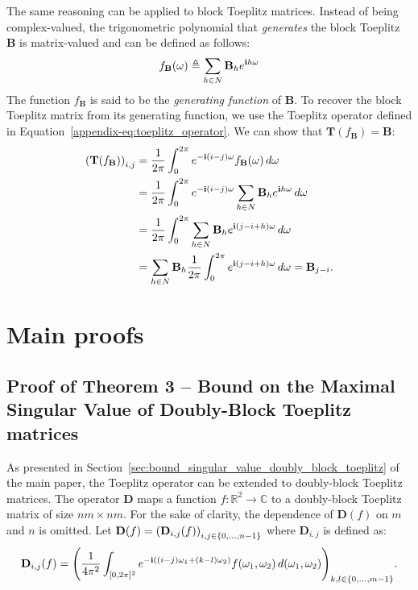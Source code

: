 The same reasoning can be applied to block Toeplitz matrices. Instead of being complex-valued, the trigonometric polynomial that {\em generates} the block Toeplitz $\mathbf{B}$ is matrix-valued and can be defined as follows:
\begin{equation}
    f_{\mathbf{B}}(\omega) \triangleq \sum_{h \in N} \mathbf{B}_h e^{\mathbf{i} h \omega}
\end{equation}
The function $f_{\mathbf{B}}$ is said to be the \emph{generating function} of $\mathbf{B}$. To recover the block Toeplitz matrix from its generating function, we use the Toeplitz operator defined in Equation~\ref{appendix-eq:toeplitz_operator}. We can show that $\mathbf{T}(f_\mathbf{B}) = \mathbf{B}$:
\begin{align}
    \leftmat \mathbf{T}(f_\mathbf{B}) \rightmat_{i, j} &= \frac{1}{2\pi} \int_0^{2\pi} e^{-\ci (i-j)\omega} f_{\mathbf{B}}(\omega) \,d\omega  \\
    &= \frac{1}{2\pi} \int_0^{2\pi} e^{-\ci (i-j) \omega} \sum_{h \in N} \mathbf{B}_h e^{\ci h \omega} \,d\omega  \\
    &= \frac{1}{2\pi} \int_0^{2\pi} \sum_{h \in N} \mathbf{B}_h e^{\ci (j - i + h) \omega} \,d\omega  \\
    &= \sum_{h \in N} \mathbf{B}_h \frac{1}{2\pi} \int_0^{2\pi} e^{\ci (j - i + h) \omega} \,d\omega 
    = \mathbf{B}_{j-i} .
\end{align}





\section{Main proofs}

\subsection{Proof of Theorem 3 -- Bound on the Maximal Singular Value of Doubly-Block Toeplitz matrices}

As presented in Section~\ref{sec:bound_singular_value_doubly_block_toeplitz} of the main paper, the Toeplitz operator can be extended to doubly-block Toeplitz matrices. 
The operator $\mathbf{D}$ maps a function $f: \mathbb{R}^2 \rightarrow \mathbb{C}$ to a doubly-block Toeplitz matrix of size $nm \times nm$. For the sake of clarity, the dependence of $\mathbf{D}(f)$  on $m$ and $n$ is omitted. Let $\mathbf{D}(f) =\leftmat\mathbf{D}_{i,j}(f)\rightmat_{i,j\in\{0, \ldots, n-1 \}}$ where $\mathbf{D}_{i,j}$ is defined as:
\begin{equation} 
    \mathbf{D}_{i,j}(f) =\leftmat\frac{1}{4\pi^{2}}\int_{[0,2\pi]^{2}}e^{-\mathbf{i}\left((i-j)\omega_{1}+(k-l)\omega_{2}\right)}f(\omega_{1},\omega_{2})\,d(\omega_{1},\omega_{2})\rightmat_{k,l\in\{0, \ldots, m-1\}} .
\end{equation}


